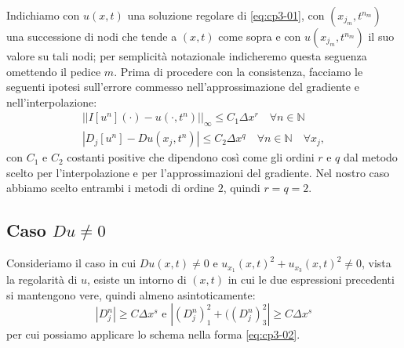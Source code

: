 Indichiamo con $u(x,t)$ una soluzione regolare di \eqref{eq:cp3-01}, con $(x_{j_m},t^{n_m})$ una successione di nodi che tende a $(x,t)$ come sopra e con $u(x_{j_m},t^{n_m})$ il suo valore su tali nodi; per semplicità notazionale indicheremo questa seguenza omettendo il pedice $m$.
Prima di procedere con la consistenza, facciamo le seguenti ipotesi sull'errore commesso nell'approssimazione del gradiente e nell'interpolazione:
\begin{gather}
\label{eq:cp3-04}
||I[u^n](\cdot)-u(\cdot,t^n)||_{\infty}\le C_1\Delta x^r\quad\forall n\in\mathbb{N} \\
\label{eq:cp3-05}
|D_j[u^n]-Du(x_j,t^n)|\le C_2\Delta x^q\quad\forall n\in\mathbb{N}\quad\forall x_j, 
\end{gather}
con $C_1$ e $C_2$ costanti positive che dipendono così come gli ordini $r$ e $q$ dal metodo scelto per l'interpolazione e per l'approssimazioni del gradiente. Nel nostro caso abbiamo scelto entrambi i metodi di ordine $2$, quindi $r=q=2$.

%
\subsection{Caso $Du \ne 0$}

Consideriamo il caso in cui $Du(x,t)\ne 0$ e $u_{x_1}(x,t)^2+u_{x_3}(x,t)^2\ne 0$, vista la regolarità di $u$, esiste un intorno di $(x,t)$ in cui le due espressioni precedenti si mantengono vere, quindi almeno asintoticamente:
\[
|D_j^n|\ge C\Delta x^s\text{ e }|(D_j^n)_1^2+((D_j^n)_3^2|\ge C\Delta x^s
\]
per cui possiamo applicare lo schema nella forma \eqref{eq:cp3-02}.

